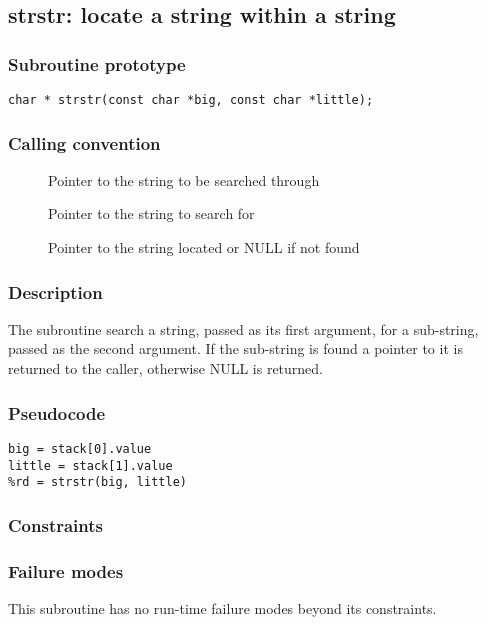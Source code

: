 \clearpage
{}
{}
\label{subr:strstr}
\subsection*{strstr: locate a string within a string}

\subsubsection*{Subroutine prototype}

\begin{verbatim}
char * strstr(const char *big, const char *little);
\end{verbatim}

\subsubsection*{Calling convention}

\begin{description}
\item[] Pointer to the string to be searched through
\item[] Pointer to the string to search for
\item[] Pointer to the string located or NULL if not found
\end{description}

\subsubsection*{Description}

The  subroutine search a string, passed as its first
argument, for a sub-string, passed as the second argument. If the
sub-string is found a pointer to it is returned to the caller,
otherwise NULL is returned.

\subsubsection*{Pseudocode}

\begin{verbatim}
big = stack[0].value
little = stack[1].value
%rd = strstr(big, little)
\end{verbatim}

\subsubsection*{Constraints}

\subsubsection*{Failure modes}

This subroutine has no run-time failure modes beyond its constraints.
